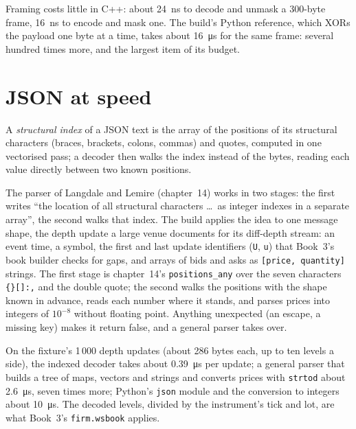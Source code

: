 \label{lst:ll:websocket-rest-tls-and-json-at-speed:unmask}

Framing costs little in C++: about \qty{24}{\nano\second} to decode and unmask a 300-byte frame, \qty{16}{\nano\second} to
encode and mask one. The build's Python reference, which XORs the payload one byte at a time, takes about
\qty{16}{\micro\second} for the same frame: several hundred times more, and the largest item of its budget.

\section{JSON at speed}

\begin{definition}\label{def:ll:websocket-rest-tls-and-json-at-speed:index}
A \emph{structural index} of a JSON text is the array of the positions of its structural characters (braces, brackets,
colons, commas) and quotes, computed in one vectorised pass; a decoder then walks the index instead of the bytes, reading each
value directly between two known positions.
\end{definition}

The parser of Langdale and Lemire (chapter~14) works in two stages: the first writes ``the location of all structural
characters \dots\ as integer indexes in a separate array'', the second walks that index. The build applies the idea to one
message shape, the depth update a large venue documents for its diff-depth stream: an event time, a symbol, the first and last
update identifiers (\texttt{U}, \texttt{u}) that Book~3's book builder checks for gaps, and arrays of bids and asks as
\texttt{[price, quantity]} strings. The first stage is chapter~14's \texttt{positions\_any} over the seven characters
\texttt{\{\}[]:,} and the double quote; the second walks the positions with the shape known in advance, reads each number where it stands, and
parses prices into integers of $10^{-8}$ without floating point. Anything unexpected (an escape, a missing key) makes it
return false, and a general parser takes over.

\label{lst:ll:websocket-rest-tls-and-json-at-speed:walk}

On the fixture's 1\,000 depth updates (about 286 bytes each, up to ten levels a side), the indexed decoder takes about
\qty{0.39}{\micro\second} per update; a general parser that builds a tree of maps, vectors and strings and converts prices
with \texttt{strtod} about \qty{2.6}{\micro\second}, seven times more; Python's \texttt{json} module and the conversion to
integers about \qty{10}{\micro\second}. The decoded levels, divided by the instrument's tick and lot, are what Book~3's
\texttt{firm.wsbook} applies.

